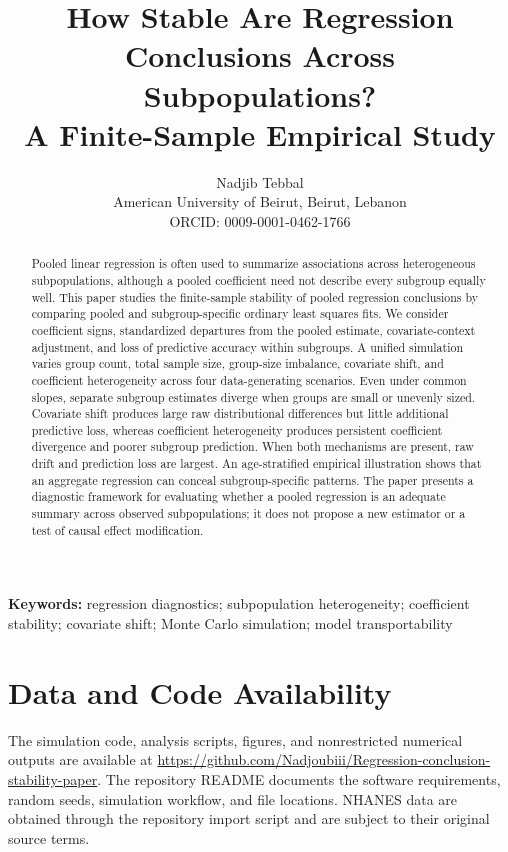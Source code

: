 \documentclass[11pt]{article}
\title{How Stable Are Regression Conclusions Across Subpopulations?\\A Finite-Sample Empirical Study}
\author{Nadjib Tebbal\\American University of Beirut, Beirut, Lebanon\\ORCID: 0009-0001-0462-1766}
\date{}
\begin{document}
\maketitle

\begin{abstract}
Pooled linear regression is often used to summarize associations across heterogeneous subpopulations, although a pooled coefficient need not describe every subgroup equally well. This paper studies the finite-sample stability of pooled regression conclusions by comparing pooled and subgroup-specific ordinary least squares fits. We consider coefficient signs, standardized departures from the pooled estimate, covariate-context adjustment, and loss of predictive accuracy within subgroups. A unified simulation varies group count, total sample size, group-size imbalance, covariate shift, and coefficient heterogeneity across four data-generating scenarios. Even under common slopes, separate subgroup estimates diverge when groups are small or unevenly sized. Covariate shift produces large raw distributional differences but little additional predictive loss, whereas coefficient heterogeneity produces persistent coefficient divergence and poorer subgroup prediction. When both mechanisms are present, raw drift and prediction loss are largest. An age-stratified empirical illustration shows that an aggregate regression can conceal subgroup-specific patterns. The paper presents a diagnostic framework for evaluating whether a pooled regression is an adequate summary across observed subpopulations; it does not propose a new estimator or a test of causal effect modification.
\end{abstract}

\noindent\textbf{Keywords:} regression diagnostics; subpopulation heterogeneity; coefficient stability; covariate shift; Monte Carlo simulation; model transportability








\section*{Data and Code Availability}
The simulation code, analysis scripts, figures, and nonrestricted numerical outputs are available at \url{https://github.com/Nadjoubiii/Regression-conclusion-stability-paper}. The repository README documents the software requirements, random seeds, simulation workflow, and file locations. NHANES data are obtained through the repository import script and are subject to their original source terms.
\end{document}
